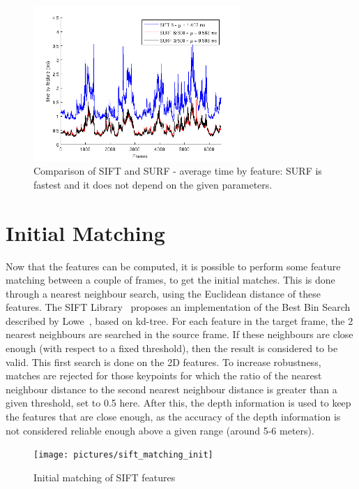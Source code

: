 \begin{figure}[H]
\begin{center}
\includegraphics[width=0.7\textwidth]{figures/stats_features_tbf}
\caption{Comparison of SIFT and SURF - average time by feature: SURF is fastest and it does not depend on the given parameters.}
\end{center}
\end{figure}

\clearpage
\section{Initial Matching}

Now that the features can be computed, it is possible to perform some feature matching between a couple of frames, to get the initial matches. This is done through a nearest neighbour search, using the Euclidean distance of these features.  
The SIFT Library~\cite{hess_sift} proposes an implementation of the Best Bin Search described by Lowe~\cite{lowe_2004_sift}, based on kd-tree. For each feature in the target frame, the 2 nearest neighbours are searched in the source frame. If these neighbours are close enough (with respect to a fixed threshold), then the result is considered to be valid. This first search is done on the 2D features. To increase robustness, matches are rejected for those keypoints for which the ratio of the nearest neighbour distance to the second nearest neighbour distance is greater than a given threshold, set to 0.5 here. After this, the depth information is used to keep the features that are close enough, as the accuracy of the depth information is not considered reliable enough above a given range (around 5-6 meters).

\begin{figure}[H]
\centering
\texttt{[image: pictures/sift\_matching\_init]}
\caption{Initial matching of SIFT features}
\end{figure}

